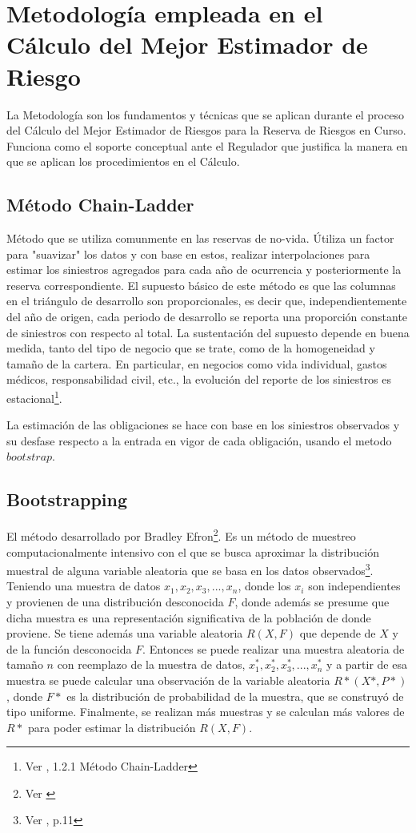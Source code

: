 \documentclass[11pt,twoside,openright,spanish]{report}
\numberwithin{equation}{chapter}
\numberwithin{figure}{chapter}
\numberwithin{table}{chapter}
\begin{document}
	\chapter{Metodología empleada en el Cálculo del Mejor Estimador de Riesgo}\label{tcyedb}
	
	La Metodología son los fundamentos y técnicas que se aplican durante el proceso del Cálculo del Mejor Estimador de Riesgos para la Reserva de Riesgos en Curso. Funciona como el soporte conceptual ante el Regulador que justifica la manera en que se aplican los procedimientos en el Cálculo.
	
	\section{Método Chain-Ladder}

	Método que se utiliza comunmente en las reservas de no-vida. Útiliza un factor para "suavizar" los datos y con base en estos, realizar interpolaciones para estimar los siniestros agregados para cada año de ocurrencia y posteriormente la reserva correspondiente. El supuesto básico de este método es que las columnas en el triángulo de desarrollo son proporcionales, es decir que, independientemente del año de origen, cada periodo de desarrollo se reporta una proporción constante de siniestros con respecto al total. La sustentación del supuesto depende en buena medida, tanto del tipo de negocio que se trate, como de la homogeneidad y tamaño de la cartera. En particular, en negocios como vida individual, gastos médicos, responsabilidad civil, etc., la evolución del reporte de los siniestros es estacional\footnote{Ver \citet{LChainLadder}, 1.2.1 Método Chain-Ladder}.  

	La estimación de las obligaciones se hace con base en los siniestros observados y su desfase respecto a la entrada en vigor de cada obligación, usando el metodo $bootstrap$.
	
	\section{Bootstrapping}
	El método desarrollado por Bradley Efron\footnote{Ver \citet{OEfron}}. Es un método de muestreo computacionalmente intensivo con el que se busca aproximar la distribución muestral de alguna variable aleatoria que se basa en los datos observados\footnote{Ver \citet{MBootstrap}, p.11}.
	Teniendo una muestra de datos $x_{1},x_{2},x_{3},...,x_{n}$, donde los $x_{i}$ son independientes y provienen de una distribución desconocida $F$, donde además se presume que dicha muestra es una representación significativa de la población de donde proviene. Se tiene además una variable aleatoria $R(X,F)$ que depende de $X$ y de la función desconocida $F$. Entonces se puede realizar una muestra aleatoria de tamaño $n$ con reemplazo de la muestra de datos, $x_{1}^{*},x_{2}^{*},x_{3}^{*},...,x_{n}^{*}$ y a partir de esa muestra se puede calcular una observación de la variable aleatoria $R*(X*,P*)$, donde $F*$ es la distribución de probabilidad de la muestra, que se construyó de tipo uniforme. Finalmente, se realizan más muestras y se calculan más valores de $R*$ para poder estimar la distribución $R(X,F)$.
\end{document}
